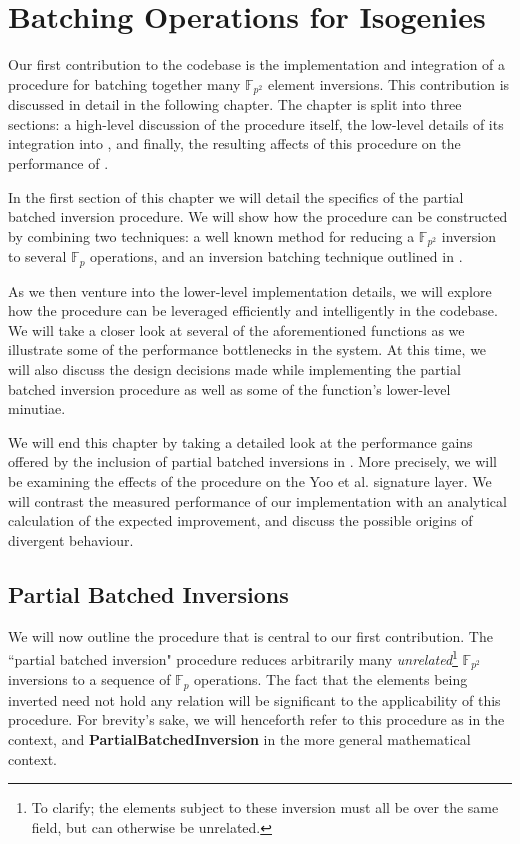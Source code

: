 \chapter{Batching Operations for Isogenies}
\label{sec:batching}

Our first contribution to the \sidh codebase is the implementation and integration of a procedure for batching together many $\mathbb{F}_{p^2}$ element inversions. This contribution is discussed in detail in the following chapter. The chapter is split into three sections: a high-level discussion of the procedure itself, the low-level details of its integration into \sidh, and finally, the resulting affects of this procedure on the performance of \sidh. 

In the first section of this chapter we will detail the specifics of the partial batched inversion procedure. We will show how the procedure can be constructed by combining two techniques: a well known method for reducing a $\mathbb{F}_{p^2}$ inversion to several $\mathbb{F}_{p}$ operations, and an inversion batching technique outlined in \cite{batching}. 

As we then venture into the lower-level implementation details, we will explore how the procedure can be leveraged efficiently and intelligently in the codebase. We will take a closer look at several of the aforementioned \sidh functions as we illustrate some of the performance bottlenecks in the system. At this time, we will also discuss the design decisions made while implementing the partial batched inversion procedure as well as some of the function's lower-level minutiae.

We will end this chapter by taking a detailed look at the performance gains offered by the inclusion of partial batched inversions in \sidh. More precisely, we will be examining the effects of the procedure on the Yoo et al. signature layer. We will contrast the measured performance of our implementation with an analytical calculation of the expected improvement, and discuss the possible origins of divergent behaviour.  

\section{Partial Batched Inversions}

We will now outline the procedure that is central to our first contribution. The ``partial batched inversion" procedure reduces arbitrarily many \emph{unrelated}\footnote{To clarify; the elements subject to these inversion must all be over the same field, but can otherwise be unrelated.} $\mathbb{F}_{p^{2}}$ inversions to a sequence of $\mathbb{F}_{p}$ operations. The fact that the elements being inverted need not hold any relation will be significant to the applicability of this procedure. For brevity's sake, we will henceforth refer to this procedure as  in the \sidh context, and \textbf{PartialBatchedInversion} in the more general mathematical context.


